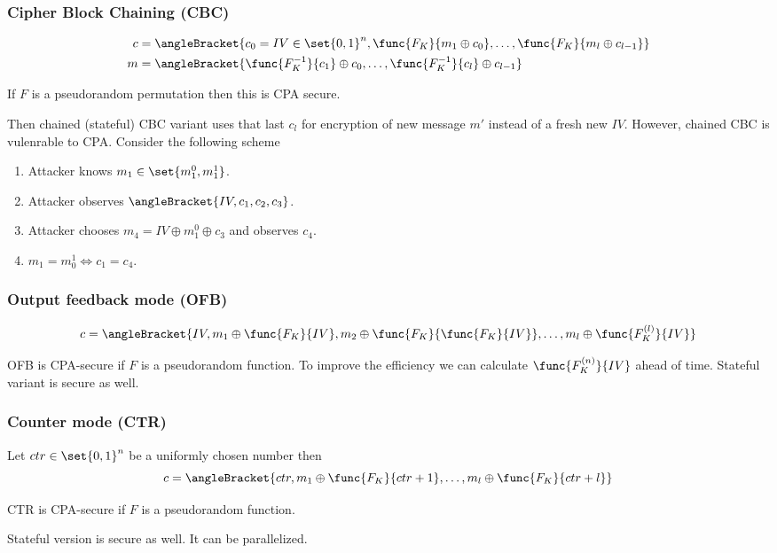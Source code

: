 \subsubsection{Cipher Block Chaining (CBC)}
\begin{align*}
    c &= \angleBracket{c_0 = IV \in \set{0,1}^n , \func{F_K}{m_1 \oplus c_0}, \dots , \func{F_K}{m_l \oplus c_{l-1}}}\\
    m &= \angleBracket{\func{F_K^{-1}}{c_1} \oplus c_0 , \dots , \func{F_K^{-1}}{c_l} \oplus c_{l-1}}
\end{align*}
\begin{proposition}
    If \(F\) is a pseudorandom permutation then this is CPA secure.
\end{proposition}
Then chained (stateful) CBC variant uses that last \(c_l\) for encryption of new message \(m'\) instead of a fresh new \(IV\). However, chained CBC is vulenrable to CPA. Consider the following scheme 
\begin{enumerate}
    \item Attacker knows \(m_1 \in \set{m_1^0 , m_1^1}\).
    \item Attacker observes \(\angleBracket{IV,c_1,c_2,c_3}\).
    \item Attacker chooses \(m_4 = IV \oplus m_1^0 \oplus c_3\) and observes \(c_4\).
    \item \(m_1 = m_0^1 \iff c_1 = c_4\).
\end{enumerate}

\subsubsection{Output feedback mode (OFB)}
\begin{equation*}
    c = \angleBracket{IV,m_1 \oplus \func{F_K}{IV}, m_2 \oplus \func{F_K}{\func{F_K}{IV}} , \dots , m_l \oplus \func{F_K^{(l)}}{IV}}
\end{equation*}
\begin{proposition}
    OFB is CPA-secure if \(F\) is a pseudorandom function. To improve the efficiency we can calculate \(\func{F_K^{(n)}}{IV}\) ahead of time. Stateful variant is secure as well.
\end{proposition}

\subsubsection{Counter mode (CTR)}
Let \(ctr \in \set{0,1}^n\) be a uniformly chosen number then
\begin{equation*}
    c = \angleBracket{ctr, m_1 \oplus \func{F_K}{ctr + 1} , \dots , m_l \oplus \func{F_K}{ctr + l}}
\end{equation*}
\begin{proposition}
    CTR is CPA-secure if \(F\) is a pseudorandom function. 
\end{proposition}
Stateful version is secure as well. It can be parallelized.